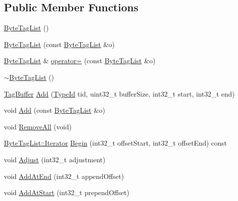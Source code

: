 \subsection*{Public Member Functions}
\begin{DoxyCompactItemize}
\item 
\hyperlink{classns3_1_1ByteTagList_a04f73de90aafb33f963ae60b8eb37c63}{Byte\+Tag\+List} ()
\item 
\hyperlink{classns3_1_1ByteTagList_aa29e9f279fccb5b399e16784bb9b5389}{Byte\+Tag\+List} (const \hyperlink{classns3_1_1ByteTagList}{Byte\+Tag\+List} \&o)
\item 
\hyperlink{classns3_1_1ByteTagList}{Byte\+Tag\+List} \& \hyperlink{classns3_1_1ByteTagList_a1f8c7b871c3a1bd5838d8169bd81df3f}{operator=} (const \hyperlink{classns3_1_1ByteTagList}{Byte\+Tag\+List} \&o)
\item 
\hyperlink{classns3_1_1ByteTagList_a0e3ad58f554844110184718416ccbcf3}{$\sim$\+Byte\+Tag\+List} ()
\item 
\hyperlink{classns3_1_1TagBuffer}{Tag\+Buffer} \hyperlink{classns3_1_1ByteTagList_ac970192e923afc561a304d17af4b8a52}{Add} (\hyperlink{classns3_1_1TypeId}{Type\+Id} tid, uint32\+\_\+t buffer\+Size, int32\+\_\+t start, int32\+\_\+t end)
\item 
void \hyperlink{classns3_1_1ByteTagList_ae8852ea2777b455d7ec4f370c864d686}{Add} (const \hyperlink{classns3_1_1ByteTagList}{Byte\+Tag\+List} \&o)
\item 
void \hyperlink{classns3_1_1ByteTagList_a989a5f3c12577fd875e701ea389709cd}{Remove\+All} (void)
\item 
\hyperlink{classns3_1_1ByteTagList_1_1Iterator}{Byte\+Tag\+List\+::\+Iterator} \hyperlink{classns3_1_1ByteTagList_acee7b77907ef44826712a630443493e7}{Begin} (int32\+\_\+t offset\+Start, int32\+\_\+t offset\+End) const 
\item 
void \hyperlink{classns3_1_1ByteTagList_a1fec06d7e6daaf8039cf2a148e4090f2}{Adjust} (int32\+\_\+t adjustment)
\item 
void \hyperlink{classns3_1_1ByteTagList_a0d8aa9cf6aaf856eb08d4f4a01f38446}{Add\+At\+End} (int32\+\_\+t append\+Offset)
\item 
void \hyperlink{classns3_1_1ByteTagList_acb4563fbe4299c55af41ba7a166b71d5}{Add\+At\+Start} (int32\+\_\+t prepend\+Offset)
\end{DoxyCompactItemize}
